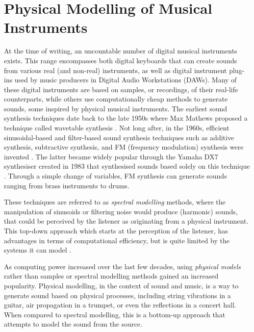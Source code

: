 \chapter{Physical Modelling of Musical Instruments}\label{ch:physMod}

At the time of writing, an uncountable number of digital musical instruments exists. This range encompasses both digital keyboards that can create sounds from various real (and non-real) instruments, as well as digital instrument plug-ins used by music producers in Digital Audio Workstations (DAWs). Many of these digital instruments are based on samples, or recordings, of their real-life counterparts, while others use computationally cheap methods to generate sounds, some inspired by physical musical instruments. The earliest sound synthesis techniques date back to the late 1950s where Max Mathews proposed a technique called wavetable synthesis \cite{Puckette2002}. Not long after, in the 1960s, efficient sinusoidal-based and filter-based sound synthesis techniques such as additive synthesis, subtractive synthesis, and FM (frequency modulation) synthesis were invented \cite{Roads1996, Chowning1973}. The latter became widely popular through the Yamaha DX7 synthesiser created in 1983 that synthesised sounds based solely on this technique \cite{DX7}. Through a simple change of variables, FM synthesis can generate sounds ranging from brass instruments to drums. 

These techniques are referred to as \textit{spectral modelling} methods, where the manipulation of sinusoids or filtering noise would produce (harmonic) sounds, that could be perceived by the listener as originating from a physical instrument. This top-down approach which starts at the perception of the listener, has advantages in terms of computational efficiency, but is quite limited by the systems it can model \cite{Smith2010a}. 

As computing power increased over the last few decades, using \textit{physical models} rather than samples or spectral modelling methods gained an increased popularity.
Physical modelling, in the context of sound and music, is a way to generate sound based on physical processes, including string vibrations in a guitar, air propagation in a trumpet, or even the reflections in a concert hall. When compared to spectral modelling, this is a bottom-up approach that attempts to model the sound from the source.  

